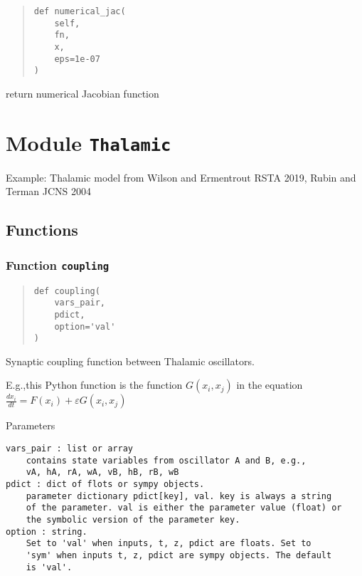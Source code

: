 \documentclass[
  english,
  a4paper,
  oneside]{article}
\begin{document}
\begin{quote}
\begin{verbatim}
def numerical_jac(
    self,
    fn,
    x,
    eps=1e-07
)
\end{verbatim}
\end{quote}

return numerical Jacobian function

\hypertarget{Thalamic}{%
\section{\texorpdfstring{Module
\texttt{Thalamic}}{Module Thalamic}}\label{Thalamic}}

Example: Thalamic model from Wilson and Ermentrout RSTA 2019, Rubin and
Terman JCNS 2004

\hypertarget{functions-1}{%
\subsection{Functions}\label{functions-1}}

\hypertarget{Thalamic.coupling}{%
\subsubsection{\texorpdfstring{Function
\texttt{coupling}}{Function coupling}}\label{Thalamic.coupling}}

\begin{quote}
\begin{verbatim}
def coupling(
    vars_pair,
    pdict,
    option='val'
)
\end{verbatim}
\end{quote}

Synaptic coupling function between Thalamic oscillators.

E.g.,this Python function is the function \(G(x_i,x_j)\) in the equation
\(\frac{dx_i}{dt} = F(x_i) + \varepsilon G(x_i,x_j)\)

Parameters

\begin{verbatim}
vars_pair : list or array
    contains state variables from oscillator A and B, e.g.,
    vA, hA, rA, wA, vB, hB, rB, wB  
pdict : dict of flots or sympy objects.
    parameter dictionary pdict[key], val. key is always a string
    of the parameter. val is either the parameter value (float) or 
    the symbolic version of the parameter key.
option : string.
    Set to 'val' when inputs, t, z, pdict are floats. Set to
    'sym' when inputs t, z, pdict are sympy objects. The default
    is 'val'.
\end{verbatim}
\end{document}
